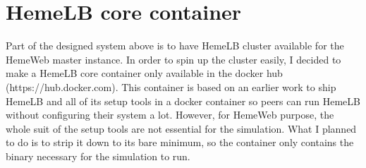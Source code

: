 \section{HemeLB core container}

Part of the designed system above is to have HemeLB cluster available for the HemeWeb master instance. In order to spin up the cluster easily, I decided to make a HemeLB core container only available in the docker hub (https://hub.docker.com). This container is based on an earlier work to ship HemeLB and all of its setup tools in a docker container so peers can run HemeLB without configuring their system a lot. However, for HemeWeb purpose, the whole suit of the setup tools are not essential for the simulation. What I planned to do is to strip it down to its bare minimum, so the container only contains the binary necessary for the simulation to run.

